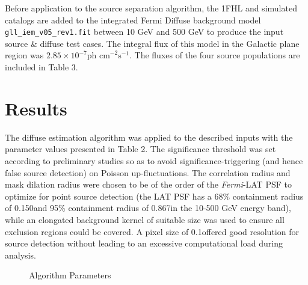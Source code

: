 \documentclass{PoS}
\begin{document}
Before application to the source separation algorithm, the 1FHL and simulated catalogs are added to the integrated Fermi Diffuse background model \verb|gll_iem_v05_rev1.fit| between 10 GeV and 500 GeV to produce the input source \& diffuse test cases. The integral flux of this model in the Galactic plane region was $2.85 \times 10^{-7} \text{ph cm}^{-2}\text{s}^{-1}$. The fluxes of the four source populations are included in Table 3.

\section{Results}

The diffuse estimation algorithm was applied to the described inputs with the parameter values presented in Table 2. The significance threshold was set according to preliminary studies so as to avoid significance-triggering (and hence false source detection) on Poisson up-fluctuations. The correlation radius and mask dilation radius were chosen to be of the order of the \textit{Fermi}-LAT PSF to optimize for point source detection (the LAT PSF has a 68\% containment radius of 0.150\degree and 95\% containment radius of 0.867\degree in the 10-500 GeV energy band), while an elongated background kernel of suitable size was used to ensure all exclusion regions could be covered. A pixel size of 0.1\degree offered good resolution for source detection without leading to an excessive computational load during analysis.

\begin{figure}
\vspace{-10pt}
\centering
{}
\makeatletter
\def\@captype{table}
\makeatother
\caption{Algorithm Parameters}
\vspace{-10pt}
\end{figure}
\end{document}
